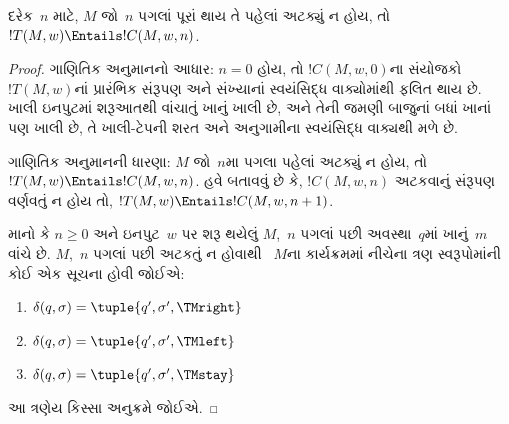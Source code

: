 \begin{lem}
દરેક~$n$ માટે, $M$ જો~$n$ પગલાં પૂરાં થાય તે
પહેલાં અટક્યું ન હોય, તો
$!T(M, w) \Entails !C(M, w, n)$.
\end{lem}

\begin{proof}
ગાણિતિક અનુમાનનો આધાર: $n = 0$ હોય, તો
$!C(M, w, 0)$ના સંયોજકો~$!T(M,w)$નાં
પ્રારંભિક સંરૂપણ અને સંખ્યાનાં સ્વયંસિદ્ધ વાક્યોમાંથી
ફલિત થાય છે. ખાલી ઇનપુટમાં શરૂઆતથી વાંચાતું
ખાનું ખાલી છે, અને તેની જમણી બાજુનાં બધાં
ખાનાં પણ ખાલી છે, તે ખાલી-ટેપની શરત અને
અનુગામીના સ્વયંસિદ્ધ વાક્યથી મળે છે.

ગાણિતિક અનુમાનની ધારણા: $M$ જો~$n$મા પગલા પહેલાં
અટક્યું ન હોય, તો $!T(M,w) \Entails !C(M, w, n)$.
હવે બતાવવું છે કે, $!C(M, w, n)$ અટકવાનું સંરૂપણ
વર્ણવતું ન હોય તો,
$!T(M, w) \Entails !C(M, w, n+1)$.

માનો કે $n \ge 0$ અને ઇનપુટ~$w$ પર શરૂ થયેલું
$M$,~$n$ પગલાં પછી અવસ્થા~$q$માં ખાનું~$m$
વાંચે છે. $M$,~$n$ પગલાં પછી અટકતું ન હોવાથી
~$M$ના કાર્યક્રમમાં નીચેના ત્રણ સ્વરૂપોમાંની કોઈ એક
સૂચના હોવી જોઈએ:

\begin{enumerate}
\item {} $\delta(q, \sigma) = \tuple{q', \sigma', \TMright}$

\item {} $\delta(q, \sigma) = \tuple{q', \sigma', \TMleft}$

\item {} $\delta(q, \sigma) = \tuple{q', \sigma', \TMstay}$
\end{enumerate}

આ ત્રણેય કિસ્સા અનુક્રમે જોઈએ.


\end{proof}
